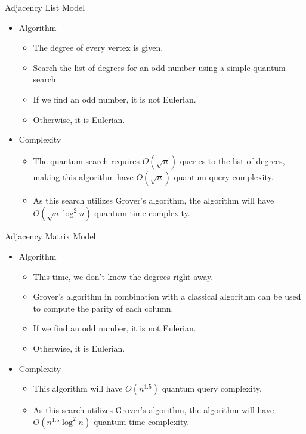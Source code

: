\documentclass[aspectratio=169, handout]{beamer}
\begin{document}
\begin{frame}{Adjacency List Model}
\begin{itemize}
    \item Algorithm \cite{site:dorn} \pause
    \begin{itemize}
        \item The degree of every vertex is given. \pause
        \item Search the list of degrees for an odd number using a simple quantum search. \pause
        \item If we find an odd number, it is not Eulerian. \pause
        \item Otherwise, it is Eulerian. \pause
    \end{itemize}
    \item Complexity \pause
    \begin{itemize}
        \item The quantum search requires $O(\sqrt{n})$ queries to the list of degrees, making this algorithm have $O(\sqrt{n})$ quantum query complexity. \pause
        \item As this search utilizes Grover's algorithm, the algorithm will have $O(\sqrt{n} \log^2 n)$ quantum time complexity.
    \end{itemize}
\end{itemize}
\end{frame}

\begin{frame}{Adjacency Matrix Model}
\begin{itemize}
    \item Algorithm \pause
    \begin{itemize}
        \item This time, we don't know the degrees right away. \pause
        \item Grover's algorithm in combination with a classical algorithm can be used to compute the parity of each column. \pause
        \item If we find an odd number, it is not Eulerian. \pause
        \item Otherwise, it is Eulerian. \pause
    \end{itemize}
    \item Complexity \pause
    \begin{itemize}
        \item This algorithm will have $O(n^{1.5})$ quantum query complexity. \pause
        \item As this search utilizes Grover's algorithm, the algorithm will have $O(n^{1.5} \log^2 n)$ quantum time complexity.
    \end{itemize}
\end{itemize}
\end{frame}
\end{document}
